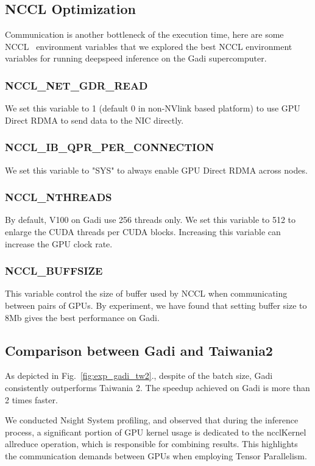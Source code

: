 \subsection{NCCL Optimization}
Communication is another bottleneck of the execution time, here are some NCCL~\cite{jeaugey2017nccl} environment variables that we explored the best NCCL environment variables for running deepspeed inference on the Gadi supercomputer.
\subsubsection{NCCL\_NET\_GDR\_READ}
We set this variable to 1 (default 0 in non-NVlink based platform) to use GPU Direct RDMA to send data to the NIC directly.
\subsubsection{NCCL\_IB\_QPR\_PER\_CONNECTION}
We set this variable to "SYS" to always enable GPU Direct RDMA across nodes.
\subsubsection{NCCL\_NTHREADS}
By default, V100 on Gadi use 256 threads only. We set this variable to 512 to enlarge the CUDA threads per CUDA blocks. Increasing this variable can increase the GPU clock rate.
\subsubsection{NCCL\_BUFFSIZE}
This variable control the size of buffer used by NCCL when communicating between pairs of GPUs. By experiment, we have found that setting buffer size to 8Mb gives the best performance on Gadi.



\subsection{Comparison between Gadi and Taiwania2}
As depicted in Fig.~\ref{fig:exp_gadi_tw2}., despite of the batch size, Gadi consistently outperforms Taiwania 2. The speedup achieved on Gadi is more than 2 times faster.

We conducted Nsight System profiling, and observed that during the inference process, a significant portion of GPU kernel usage is dedicated to the ncclKernel allreduce operation, which is responsible for combining results. This highlights the communication demands between GPUs when employing Tensor Parallelism.

